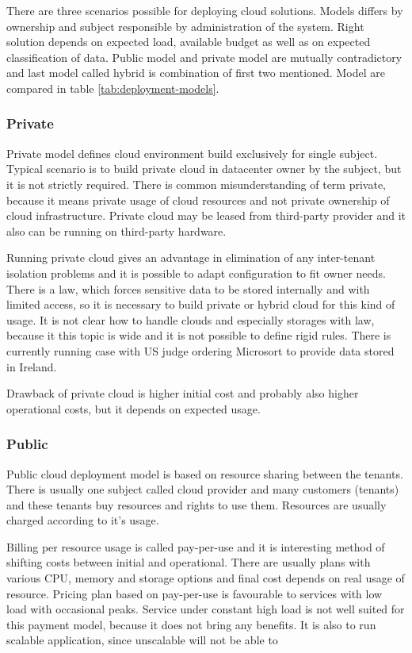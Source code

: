 
There are three scenarios possible for deploying cloud solutions. Models differs by ownership and subject responsible by administration of the system. Right solution depends on expected load, available budget as well as on expected classification of data. Public model and private model are mutually contradictory and last model called hybrid is combination of first two mentioned.
Model are compared in table \ref{tab:deployment-models}.

\subsubsection{Private}
Private model defines cloud environment build exclusively for single subject. Typical scenario is to build private cloud in datacenter owner by the subject, but it is not strictly required. There is common misunderstanding of term private, because it means private usage of cloud resources and not private ownership of cloud infrastructure. Private cloud may be leased from third-party provider and it also can be running on third-party hardware.

Running private cloud gives an advantage in elimination of any inter-tenant isolation problems and it is possible to adapt configuration to fit owner needs. There is a law, which forces sensitive data to be stored internally and with limited access, so it is necessary to build private or hybrid cloud for this kind of usage. It is not clear how to handle clouds and especially storages with law, because it this topic is wide and it is not possible to define rigid rules. There is currently running case with \Ac{US} judge ordering Microsort to provide data stored in Ireland. \cite{wp-microsoft-ireland}

Drawback of private cloud is higher initial cost and probably also higher operational costs, but it depends on expected usage.

\subsubsection{Public}
Public cloud deployment model is based on resource sharing between the tenants. There is usually one subject called cloud provider and many customers (tenants) and these tenants buy resources and rights to use them. Resources are usually charged according to it's usage.

Billing per resource usage is called pay-per-use and it is interesting method of shifting costs between initial and operational. There are usually plans with various \Ac{CPU}, memory and storage options and final cost depends on real usage of resource. Pricing plan based on pay-per-use is favourable to services with low load with occasional peaks. Service under constant high load is not well suited for this payment model, because it does not bring any benefits. It is also to run scalable application, since unscalable will not be able to 

